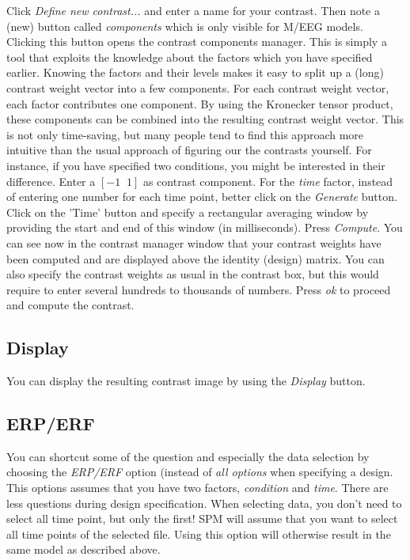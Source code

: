 Click \textit{Define new contrast...} and enter a name for your
contrast. Then note a (new) button called \textit{components} which is
only visible for M/EEG models. Clicking this button opens the contrast
components manager. This is simply a tool that exploits the knowledge
about the factors which you have specified earlier. Knowing the
factors and their levels makes it easy to split up a (long) contrast
weight vector into a few components. For each contrast weight vector,
each factor contributes one component. By using the Kronecker tensor
product, these components can be combined into the resulting contrast
weight vector. This is not only time-saving, but many people tend to
find this approach more intuitive than the usual approach of figuring
our the contrasts yourself. For instance, if you have specified
two conditions, you might be interested in their difference. Enter a
$[-1 \; \; 1]$ as contrast component. For the \textit{time} factor,
instead of entering one number for each time point, better click on 
the \textit{Generate} button. Click on the 'Time' button and specify
a rectangular averaging window by providing the start and end of this
window (in milliseconds). Press \textit{Compute}. You can see now in
the contrast manager window that your contrast weights have been
computed and are displayed above the identity (design)
matrix. You can also specify the contrast weights as usual in the
contrast box, but this would require to enter several hundreds to
thousands of numbers. Press \textit{ok} to proceed and compute the
contrast.

\subsection{Display}
You can display the resulting contrast image by using the
\textit{Display} button.

\subsection{ERP/ERF}
You can shortcut some of the question and especially the data
selection by choosing the \textit{ERP/ERF} option (instead of
\textit{all options} when specifying a design. This options assumes
that you have two factors, \textit{condition} and \textit{time}. There
are less questions during design specification. When selecting data,
you don't need to select all time point, but only the first! SPM will
assume that you want to select all time points of the selected
file. Using this option will otherwise result in the same model
as described above.

